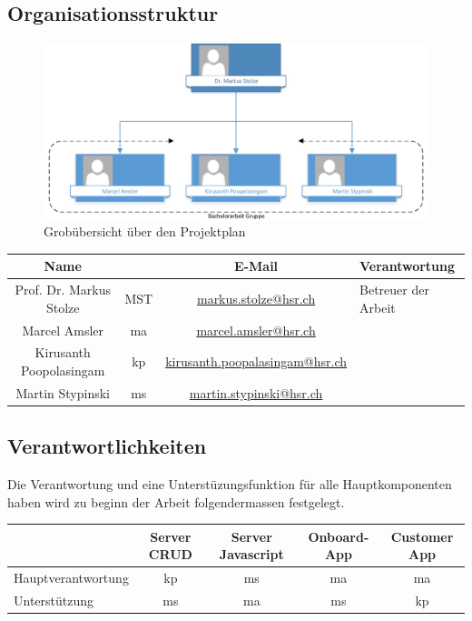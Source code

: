 \subsection{Organisationsstruktur}
\begin{figure}[ht]
	\centering
	\includegraphics[width=\textwidth]{images/organigram.pdf}
	\caption{Grobübersicht über den Projektplan}
	\label{Risk result}
\end{figure}
\noindent
\begin{tabularx}{\textwidth}{|c|c|c|X|}
  \hline
  \textbf{Name} & & \textbf{E-Mail} & \textbf{Verantwortung} \\
  \hline \hline
  Prof. Dr. Markus Stolze & MST & \url{markus.stolze@hsr.ch} & Betreuer der Arbeit\\
  \hline \hline
  Marcel Amsler & ma &\url{marcel.amsler@hsr.ch} & \\
  \hline
  Kirusanth Poopolasingam & kp & \url{kirusanth.poopalasingam@hsr.ch} & \\
  \hline
  Martin Stypinski & ms & \url{martin.stypinski@hsr.ch} & \\
  \hline
\end{tabularx}
\newpage

\subsection{Verantwortlichkeiten}
Die Verantwortung und eine Unterstüzungsfunktion für alle Hauptkomponenten haben wird zu beginn der Arbeit folgendermassen festgelegt.\\

\begin{tabularx}{\textwidth}{|X|c|c|c|c|}
	\hline
	\textbf{} & \textbf{Server CRUD} & \textbf{Server Javascript} & \textbf{Onboard-App} & \textbf{Customer App} \\
	\hline 	\hline
	Hauptverantwortung & kp & ms & ma & ma\\
	\hline
	Unterstützung & ms & ma & ms & kp \\
	\hline
\end{tabularx}\\
\newpage


